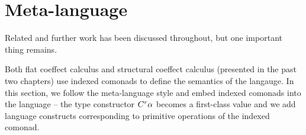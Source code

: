 %                                                                                             

\section{Meta-language}
\label{sec:conclusions-meta} 

Related and further work has been discussed throughout, but one important thing remains.

Both flat coeffect calculus and structural coeffect calculus (presented in the past two chapters)
use indexed comonads to define the semantics of the langauge. In this section, we follow the 
meta-language style and embed indexed comonads into the language -- the type constructor
$C^{r}\alpha$ becomes a first-class value and we add language constructs corresponding to
primitive operations of the indexed comonad.


\newcommand{\munit}{\mathsf{e}}
\newcommand{\mseq}[0]{ \oplus }


